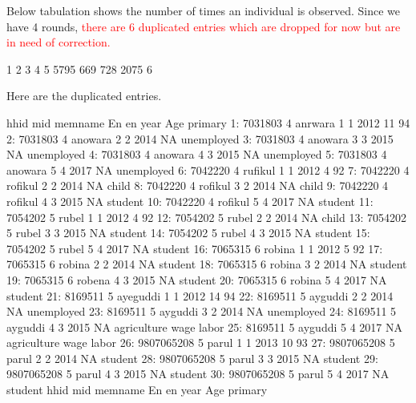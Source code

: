 Below tabulation shows the number of times an individual is observed. Since we have 4 rounds, \textcolor{red}{there are 6 duplicated entries which are dropped for now but are in need of correction.}
\begin{Schunk}
\begin{Soutput}

   1    2    3    4    5 
5795  669  728 2075    6 
\end{Soutput}
\end{Schunk}
Here are the duplicated entries.
\begin{Schunk}
\begin{Soutput}
          hhid mid  memname En en year Age                primary
 1:    7031803   4  anrwara  1  1 2012  11                     94
 2:    7031803   4  anowara  2  2 2014  NA             unemployed
 3:    7031803   4  anowara  3  3 2015  NA             unemployed
 4:    7031803   4  anowara  4  3 2015  NA             unemployed
 5:    7031803   4  anowara  5  4 2017  NA             unemployed
 6:    7042220   4  rufikul  1  1 2012   4                     92
 7:    7042220   4  rofikul  2  2 2014  NA                  child
 8:    7042220   4  rofikul  3  2 2014  NA                  child
 9:    7042220   4  rofikul  4  3 2015  NA                student
10:    7042220   4  rofikul  5  4 2017  NA                student
11:    7054202   5    rubel  1  1 2012   4                     92
12:    7054202   5    rubel  2  2 2014  NA                  child
13:    7054202   5    rubel  3  3 2015  NA                student
14:    7054202   5    rubel  4  3 2015  NA                student
15:    7054202   5    rubel  5  4 2017  NA                student
16:    7065315   6   robina  1  1 2012   5                     92
17:    7065315   6   robina  2  2 2014  NA                student
18:    7065315   6   robina  3  2 2014  NA                student
19:    7065315   6   robena  4  3 2015  NA                student
20:    7065315   6   robina  5  4 2017  NA                student
21:    8169511   5 ayeguddi  1  1 2012  14                     94
22:    8169511   5  ayguddi  2  2 2014  NA             unemployed
23:    8169511   5  ayguddi  3  2 2014  NA             unemployed
24:    8169511   5  ayguddi  4  3 2015  NA agriculture wage labor
25:    8169511   5  ayguddi  5  4 2017  NA agriculture wage labor
26: 9807065208   5    parul  1  1 2013  10                     93
27: 9807065208   5    parul  2  2 2014  NA                student
28: 9807065208   5    parul  3  3 2015  NA                student
29: 9807065208   5    parul  4  3 2015  NA                student
30: 9807065208   5    parul  5  4 2017  NA                student
          hhid mid  memname En en year Age                primary
\end{Soutput}
\end{Schunk}

